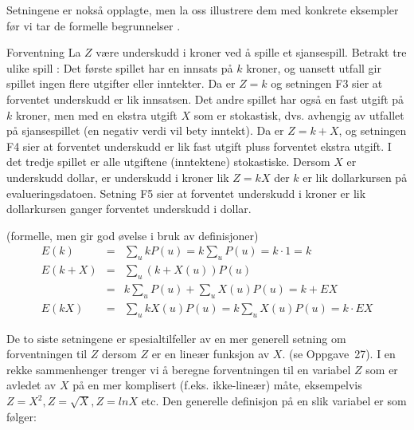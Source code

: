 \begin{center}  \end{center}
Setningene er nokså opplagte, men la oss illustrere dem med
konkrete eksempler før vi tar de formelle begrunnelser . \\

\begin{eksempel}{Forventning}
La $Z$ være underskudd i kroner ved å spille et sjansespill.
Betrakt tre ulike spill : Det første spillet har en innsats på $k$
kroner, og uansett utfall gir spillet ingen flere utgifter eller
inntekter. Da er $Z=k$ og setningen F3 sier at forventet
underskudd er lik innsatsen. Det andre spillet har også en fast
utgift på $k$ kroner, men med en ekstra utgift $X$ som er
stokastisk, dvs. avhengig av utfallet på sjansespillet (en
negativ verdi vil bety inntekt). Da er $Z=k+X$, og setningen F4
sier at forventet underskudd er lik fast utgift pluss forventet
ekstra utgift. I det tredje spillet er alle utgiftene
(inntektene) stokastiske. Dersom $X$ er underskudd dollar, er
underskudd i kroner lik $Z=kX$ der $k$ er lik dollarkursen på
evalueringsdatoen. Setning F5 sier at forventet underskudd i
kroner er lik dollarkursen ganger forventet underskudd i dollar.
\end{eksempel}

(formelle, men gir god øvelse i bruk av definisjoner)
 \begin{eqnarray*}
 E(k  )&=&\sum_{u}kP(u)=k \sum_{u}P(u)=k \cdot 1=k \\   
 E(k+X)&=&\sum_{u}(k+X(u))P(u) \\
       &=&k \sum_{u}P(u)+ \sum_{u}X(u)P(u)=k + EX \\
 E(kX) &=&\sum_{u}kX(u)P(u)=k \sum_{u}X(u)P(u)=k \cdot EX
\end{eqnarray*}

\noindent De to siste setningene er spesialtilfeller av en mer generell
setning om forventningen til $Z$ dersom $Z$ er en lineær funksjon
av $X$. (se Oppgave~27). I en rekke sammenhenger trenger vi å
beregne forventningen til en variabel $Z$ som er avledet av $X$
på en mer komplisert (f.eks. ikke-lineær) måte, eksempelvis
$Z=X^2, Z=\sqrt{X}, Z=lnX$ etc. Den generelle definisjon på en
slik variabel er som følger:

